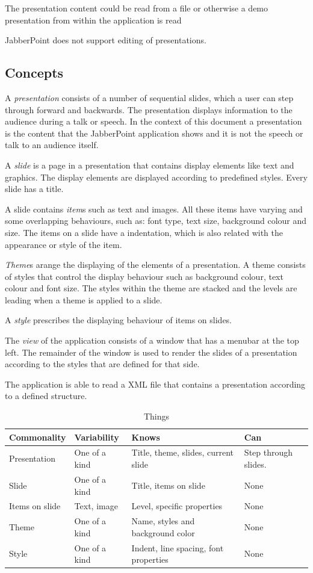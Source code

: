 \documentclass[a4paper]{article}
\begin{document}
The presentation content could be read from a file or otherwise a demo presentation from within the application is read

JabberPoint does not support editing of presentations.

\subsection{Concepts}

A \textit{presentation} consists of a number of sequential slides, which a user can step through forward and backwards. The presentation displays information to the audience during a talk or speech. In the context of this document a presentation is the content that the JabberPoint application shows and it is not the speech or talk to an audience itself.
 
A \textit{slide} is a page in a presentation that contains display elements like text and graphics. The display elements are displayed according to predefined styles. Every slide has a title.

A slide contains \textit{item}s such as text and images. All these items have varying and some overlapping  behaviours, such as: font type, text size, background colour and size. The items on a slide have a indentation, which is also related with the appearance or style of the item. 

\textit{Theme}s arange the displaying of the elements of a presentation. A theme consists of styles that control the display behaviour such as background colour, text colour and font size. The styles within the theme are stacked and the levels are leading when a theme is applied to a slide.  

A \textit{style} prescribes the displaying behaviour of items on slides. 

The \textit{view} of the application consists of a window that has a menubar at the top left. The remainder of the window is used to render the slides of a presentation according to the styles that are defined for that side.

The application is able to read a XML file that contains a presentation according to a defined structure.    

\begin{table}[!htpb]
\centering
\begin{tabular}{|l|l|l|l|}
\hline
\textbf{Commonality} & \textbf{Variability} & \textbf{Knows} & \textbf{Can}\\
\hline
\hline
Presentation & One of a kind & Title, theme, slides, current slide & Step through slides.\\
\hline
Slide & One of a kind & Title, items on slide & None\\ 
\hline
Items on slide & Text, image & Level, specific properties & None\\
\hline
Theme & One of a kind & Name, styles and background color & None\\
\hline
Style & One of a kind & Indent, line spacing, font properties & None\\
\hline
\end{tabular}
\caption{Things}
\label{tab:template}
\end{table}
\end{document}
